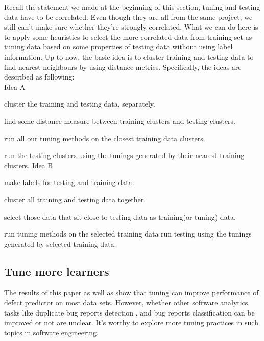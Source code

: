 Recall the statement we made at the beginning of this section, tuning and testing data have to be correlated.
Even though they are all from the same project, we still can't make sure whether they're strongly
correlated. What we can do here is to apply some heuristics to select the more correlated data from training set as tuning data based
on some properties of testing data without using label information. Up to now, the basic idea is to cluster
training and testing data to find nearest neighbours
by using distance metrics. Specifically, the ideas are described as following:\\
Idea A
\bi
\item cluster the training and testing data, separately.
\item find some distance measure between training clusters and testing clusters.
\item run all our tuning methods on the closest training data clusters.
\item run the testing clusters using the tunings generated by their nearest training clusters.
\ei
Idea B
\bi
\item make labels for testing and training data.
\item cluster all training and testing data together.
\item select those data that sit close to testing data as training(or tuning) data.
\item run tuning methods on the selected training data
run testing using the tunings generated by selected training data.
\ei


\subsection{Tune more learners}
The results of this paper as well as \cite{tantithamthavorn2016automated} show that tuning
can improve performance of defect predictor on most data
sets. However, whether other software analytics tasks like
duplicate bug reports detection \cite{sun2010discriminative,jalbert2008automated,alipour2013contextual,nguyen2012duplicate}, and bug reports classification \cite{antoniol2008bug,zanetti2013categorizing,lamkanfi2011comparing,tian2013drone} can be improved or not are unclear. It's worthy to explore more tuning practices in such topics in software engineering.

